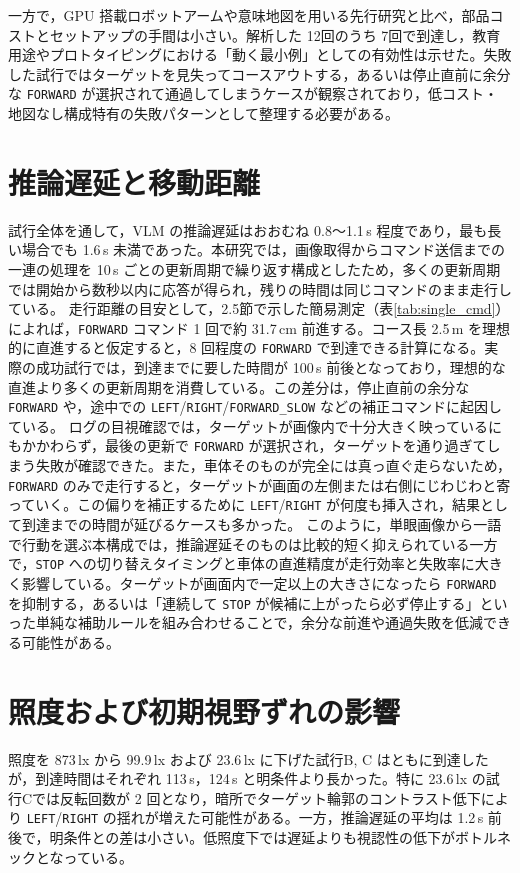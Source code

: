 \documentclass[a4paper,11pt]{ltjsreport}
\begin{document}
一方で，GPU 搭載ロボットアームや意味地図を用いる先行研究と比べ，部品コストとセットアップの手間は小さい。解析した 12回のうち 7回で到達し，教育用途やプロトタイピングにおける「動く最小例」としての有効性は示せた。失敗した試行ではターゲットを見失ってコースアウトする，あるいは停止直前に余分な \texttt{FORWARD} が選択されて通過してしまうケースが観察されており，低コスト・地図なし構成特有の失敗パターンとして整理する必要がある。

\section{推論遅延と移動距離}
試行全体を通して，VLM の推論遅延はおおむね 0.8〜1.1\,s 程度であり，最も長い場合でも 1.6\,s 未満であった。本研究では，画像取得からコマンド送信までの一連の処理を 10\,s ごとの更新周期で繰り返す構成としたため，多くの更新周期では開始から数秒以内に応答が得られ，残りの時間は同じコマンドのまま走行している。
走行距離の目安として，2.5節で示した簡易測定（表\ref{tab:single_cmd}）によれば，\texttt{FORWARD} コマンド 1 回で約 31.7\,cm 前進する。コース長 2.5\,m を理想的に直進すると仮定すると，8 回程度の \texttt{FORWARD} で到達できる計算になる。実際の成功試行では，到達までに要した時間が 100\,s 前後となっており，理想的な直進より多くの更新周期を消費している。この差分は，停止直前の余分な \texttt{FORWARD} や，途中での \texttt{LEFT}/\texttt{RIGHT}/\texttt{FORWARD\_SLOW} などの補正コマンドに起因している。
ログの目視確認では，ターゲットが画像内で十分大きく映っているにもかかわらず，最後の更新で \texttt{FORWARD} が選択され，ターゲットを通り過ぎてしまう失敗が確認できた。また，車体そのものが完全には真っ直ぐ走らないため，\texttt{FORWARD} のみで走行すると，ターゲットが画面の左側または右側にじわじわと寄っていく。この偏りを補正するために \texttt{LEFT}/\texttt{RIGHT} が何度も挿入され，結果として到達までの時間が延びるケースも多かった。
このように，単眼画像から一語で行動を選ぶ本構成では，推論遅延そのものは比較的短く抑えられている一方で，\texttt{STOP} への切り替えタイミングと車体の直進精度が走行効率と失敗率に大きく影響している。ターゲットが画面内で一定以上の大きさになったら \texttt{FORWARD} を抑制する，あるいは「連続して \texttt{STOP} が候補に上がったら必ず停止する」といった単純な補助ルールを組み合わせることで，余分な前進や通過失敗を低減できる可能性がある。

\section{照度および初期視野ずれの影響}
照度を 873\,lx から 99.9\,lx および 23.6\,lx に下げた試行B, C はともに到達したが，到達時間はそれぞれ 113\,s，124\,s と明条件より長かった。特に 23.6\,lx の試行Cでは反転回数が 2 回となり，暗所でターゲット輪郭のコントラスト低下により \texttt{LEFT}/\texttt{RIGHT} の揺れが増えた可能性がある。一方，推論遅延の平均は 1.2\,s 前後で，明条件との差は小さい。低照度下では遅延よりも視認性の低下がボトルネックとなっている。
\end{document}
